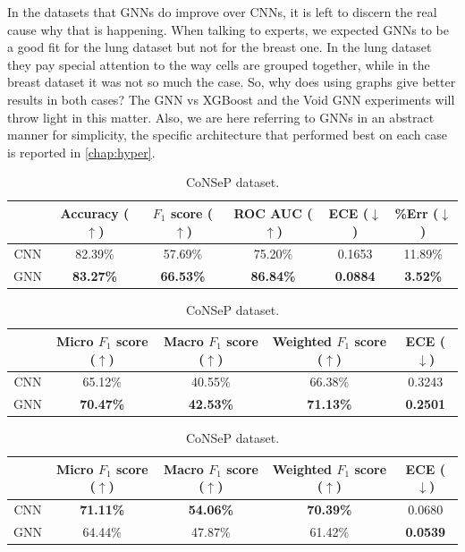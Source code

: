In the datasets that GNNs do improve over CNNs, it is left to discern the real cause why that is happening. When talking to experts, we expected GNNs to be a good fit for the lung dataset but not for the breast one. In the lung dataset they pay special attention to the way cells are grouped together, while in the breast dataset it was not so much the case. So, why does using graphs give better results in both cases? The GNN vs XGBoost and the Void GNN experiments will throw light in this matter. Also, we are here referring to GNNs in an abstract manner for simplicity, the specific architecture that performed best on each case is reported in \autoref{chap:hyper}.

\begin{table}[ht]
\centering
\caption{Result of the GNN vs CNN experiment.}

\begin{tabular}{c|c|c|c|c|c|}
  \cline{2-6}
  & Accuracy ($\uparrow$) & $F_1$ score ($\uparrow$) & ROC AUC ($\uparrow$) & ECE ($\downarrow$) & \%Err ($\downarrow$) \\ \hline
\multicolumn{1}{|c|}{CNN}  & 82.39\% & 57.69\% & 75.20\% & 0.1653 & 11.89\% \\ \hline
\multicolumn{1}{|c|}{GNN}  & \textbf{83.27\%} & \textbf{66.53\%} & \textbf{86.84\%} & \textbf{0.0884} & \textbf{3.52\%} \\ \hline
\end{tabular}
\caption{DigiPatics lung dataset.}
\label{tab:gnn-cnn}

\vspace{0.5cm}

\begin{tabular}{c|c|c|c|c|}
  \cline{2-5}
  & Micro $F_1$ score ($\uparrow$) & Macro $F_1$ score ($\uparrow$) & Weighted $F_1$ score ($\uparrow$) & ECE ($\downarrow$) \\ \hline
\multicolumn{1}{|c|}{CNN}  & 65.12\% & 40.55\% & 66.38\% & 0.3243 \\ \hline
\multicolumn{1}{|c|}{GNN}  & \textbf{70.47\%} & \textbf{42.53\%} & \textbf{71.13\%} & \textbf{0.2501} \\ \hline
\end{tabular}
\caption{DigiPatics breast dataset.}

\vspace{0.5cm}

\begin{tabular}{c|c|c|c|c|}
  \cline{2-5}
  & Micro $F_1$ score ($\uparrow$) & Macro $F_1$ score ($\uparrow$) & Weighted $F_1$ score ($\uparrow$) & ECE ($\downarrow$) \\ \hline
\multicolumn{1}{|c|}{CNN}  & \textbf{71.11\%} & \textbf{54.06\%} & \textbf{70.39\%} & 0.0680 \\ \hline
\multicolumn{1}{|c|}{GNN}  & 64.44\% & 47.87\% & 61.42\% & \textbf{0.0539} \\ \hline
\end{tabular}
\caption{CoNSeP dataset.}


\end{table}
